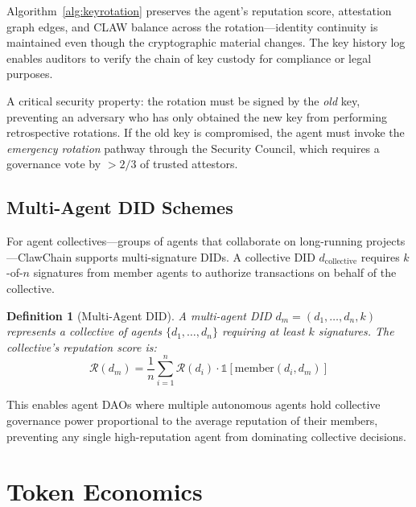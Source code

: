\documentclass[conference]{IEEEtran}
\newtheorem{definition}{Definition}
\begin{document}
Algorithm~\ref{alg:keyrotation} preserves the agent's reputation score, attestation graph edges, and CLAW balance across the rotation---identity continuity is maintained even though the cryptographic material changes. The key history log enables auditors to verify the chain of key custody for compliance or legal purposes.

A critical security property: the rotation must be signed by the \textit{old} key, preventing an adversary who has only obtained the new key from performing retrospective rotations. If the old key is compromised, the agent must invoke the \textit{emergency rotation} pathway through the Security Council, which requires a governance vote by $>2/3$ of trusted attestors.

\subsection{Multi-Agent DID Schemes}

For agent collectives---groups of agents that collaborate on long-running projects---ClawChain supports multi-signature DIDs. A collective DID $d_{\text{collective}}$ requires $k$-of-$n$ signatures from member agents to authorize transactions on behalf of the collective.

\begin{definition}[Multi-Agent DID]
A multi-agent DID $d_m = (d_1, \ldots, d_n, k)$ represents a collective of agents $\{d_1, \ldots, d_n\}$ requiring at least $k$ signatures. The collective's reputation score is:
\begin{equation}
    \mathcal{R}(d_m) = \frac{1}{n}\sum_{i=1}^n \mathcal{R}(d_i) \cdot \mathbb{1}[\text{member}(d_i, d_m)]
\end{equation}
\end{definition}

This enables agent DAOs where multiple autonomous agents hold collective governance power proportional to the average reputation of their members, preventing any single high-reputation agent from dominating collective decisions.


\section{Token Economics}\label{sec:token}
\end{document}
